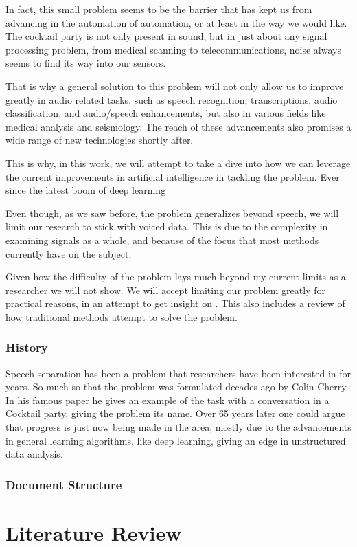 \documentclass{book}
\begin{document}
In fact, this small problem seems to be the barrier that has kept us from advancing in the automation of automation, or at least in the way we would like.
The cocktail party is not only present in sound, but in just about any signal processing problem, from medical scanning to telecommunications\cite{CocktailPartyProblemRevisit}, noise always seems to find its way into our sensors.
\par
That is why a general solution to this problem will not only allow us to improve greatly in audio related tasks, such as speech recognition, transcriptions, audio classification, and audio/speech enhancements, but also in various fields like medical analysis and seismology.
The reach of these advancements also promises a wide range of new technologies shortly after.
\par
This is why, in this work, we will attempt to take a dive into how we can leverage the current improvements in artificial intelligence in tackling the problem.
Ever since the latest boom of deep learning \cite{DeepLearning}
\par
Even though, as we saw before, the problem generalizes beyond speech, we will limit our research to stick with voiced data.
This is due to the complexity in examining signals as a whole, and because of the focus that most methods currently have on the subject.
\par
Given how the difficulty of the problem lays much beyond my current limits as a researcher we will not show.
We will accept limiting our problem greatly for practical reasons, in an attempt to get insight on .
This also includes a review of how traditional methods attempt to solve the problem.
\section{History}
\qquad Speech separation has been a problem that researchers have been interested in for years.
So much so that the problem was formulated decades ago by Colin Cherry\cite{Cherry}.
In his famous paper he gives an example of the task with a conversation in a Cocktail party, giving the problem its name.
Over 65 years later one could argue that progress is just now being made in the area, mostly due to the advancements in general learning algorithms, like deep learning, giving an edge in unstructured data analysis.
\section{Document Structure}
\part{Literature Review}
\end{document}
